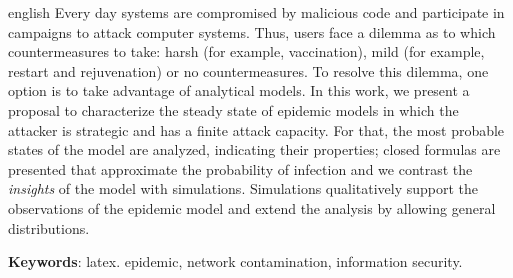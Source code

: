 
\begin{resumo}[Abstract]
 \begin{otherlanguage*}{english}
   Every day systems are compromised by malicious code and participate in campaigns to attack computer systems.
Thus, users face a dilemma as to which countermeasures to take: harsh (for example, vaccination), mild (for example, restart and rejuvenation) or no countermeasures. To resolve this dilemma, one option is to take advantage of analytical models. In this work, we present a proposal to characterize the steady state of epidemic models in which the attacker is strategic and has a finite attack capacity. For that, the most probable states of the model are analyzed, indicating their properties; closed formulas are presented that approximate the probability of infection and we contrast the \textit{insights} of the model with simulations. Simulations qualitatively support the observations of the epidemic model and extend the analysis by allowing general distributions.

   \vspace{\onelineskip}
 
   \noindent 
   \textbf{Keywords}: latex. epidemic, network contamination, information security.
 \end{otherlanguage*}
\end{resumo}